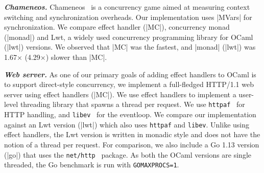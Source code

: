 \documentclass[sigplan,10pt,review,anonymous]{acmart}\settopmatter{printfolios=true,printccs=false,printacmref=false}
\begin{document}
\textbf{\textit{Chameneos.}} Chameneos~\cite{Chameneos} is a concurrency game
aimed at measuring context switching and synchronization overheads. Our
implementation uses |MVars| for synchronization. We compare effect handler
(|MC|), concurrency monad (|monad|) and Lwt, a widely used concurrency
programming library for OCaml (|lwt|) versions. We observed that |MC| was the
fastest, and |monad| (|lwt|) was 1.67$\times$ (4.29$\times$) slower than |MC|.

\textbf{\textit{Web server.}} As one of our primary goals of adding effect
handlers to OCaml is to support direct-style concurrency, we implement a
full-fledged HTTP/1.1 web server using effect handlers (|MC|). We use effect
handlers to implement a user-level threading library that spawns a thread per
request. We use \texttt{httpaf}~\cite{httpaf} for HTTP handling, and
\texttt{libev}~\cite{libev} for the eventloop. We compare our implementation
against an Lwt version (|lwt|) which also uses \texttt{httpaf} and
\texttt{libev}. Unlike using effect handlers, the Lwt version is written in monadic
style and does not have the notion of a thread per request. For comparison, we
also include a Go 1.13 version (|go|) that uses the
\texttt{net/http}~\cite{nethttp} package. As both the OCaml versions are single
threaded, the Go benchmark is run with \texttt{GOMAXPROCS=1}.
\end{document}
